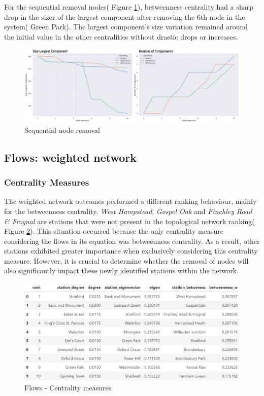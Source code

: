 \documentclass[10pt]{report}
\numberwithin{figure}{section}
\numberwithin{table}{section}
\begin{document}
For the sequential removal nodes( Figure \ref{fig:Part1_sequential_Summarise}),  betweenness centrality had a sharp drop in the sizer of the largest component after removing the 6th node in the system( Green Park). The largest component's size variation remained around the initial value in the other centralities without drastic drops or increases. 

    \begin{figure}[htp]
        \centering
        \includegraphics[width=16cm]{Image/Part1_sequential_Summarise.png}
        \caption{Sequential node removal}
        \label{fig:Part1_sequential_Summarise}
    \end{figure}


\subsection{Flows: weighted network} 

\subsubsection{Centrality Measures } 

The weighted network outcomes performed a different ranking behaviour, mainly for the betweenness centrality. \textit{West Hampstead}, \textit{Gospel Oak} and \textit{Finchley Road \& Frognal} are stations that were not present in the topological network ranking( Figure \ref{fig:Table_CentralitiesMeasures_Flows}). This situation occurred because the only centrality measure considering the flows in its equation was betweenness centrality. As a result, other stations exhibited greater importance when exclusively considering this centrality measure. However, it is crucial to determine whether the removal of nodes will also significantly impact these newly identified stations within the network.

    \begin{figure}[htp]
        \centering
        \includegraphics[width=14cm]{Image/Table_CentralitiesMeasures_Flows.png}
        \caption{Flows - Centrality measures}
        \label{fig:Table_CentralitiesMeasures_Flows}
    \end{figure}
\end{document}
